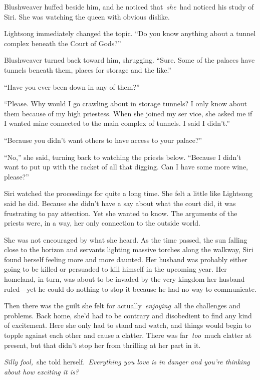 Blushweaver huffed beside him, and he noticed that~\textit{she}~had noticed his study of Siri. She was watching the queen with obvious dislike.

Lightsong immediately changed the topic. “Do you know anything about a tunnel complex beneath the Court of Gods?”

Blushweaver turned back toward him, shrugging. “Sure. Some of the palaces have tunnels beneath them, places for storage and the like.”

“Have you ever been down in any of them?”

“Please. Why would I go crawling about in storage tunnels? I only know about them because of my high priestess. When she joined my ser vice, she asked me if I wanted mine connected to the main complex of tunnels. I said I didn’t.”

“Because you didn’t want others to have access to your palace?”

“No,” she said, turning back to watching the priests below. “Because I didn’t want to put up with the racket of all that digging. Can I have some more wine, please?”

\orn

Siri watched the proceedings for quite a long time. She felt a little like Lightsong said he did. Because she didn’t have a say about what the court did, it was frustrating to pay attention. Yet she wanted to know. The arguments of the priests were, in a way, her only connection to the outside world.

She was not encouraged by what she heard. As the time passed, the sun falling close to the horizon and servants lighting massive torches along the walkway, Siri found herself feeling more and more daunted. Her husband was probably either going to be killed or persuaded to kill himself in the upcoming year. Her homeland, in turn, was about to be invaded by the very kingdom her husband ruled—yet he could do nothing to stop it because he had no way to communicate.

Then there was the guilt she felt for actually~\textit{enjoying}~all the challenges and problems. Back home, she’d had to be contrary and disobedient to find any kind of excitement. Here she only had to stand and watch, and things would begin to topple against each other and cause a clatter. There was far~\textit{too}~much clatter at present, but that didn’t stop her from thrilling at her part in it.

\textit{Silly fool,}~she told herself.~\textit{Everything you love is in danger and you’re thinking about how exciting it is?}

